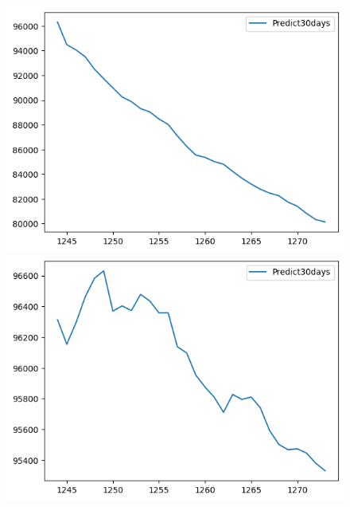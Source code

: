\begin{figure}[H]
\begin{minipage}{0.15\textwidth}
    \includegraphics[width=1\textwidth]{resources/chapter-5/predicted/VCB_ RNN_8-2_30days.png}
    \end{minipage}
    \hfill
        \begin{minipage}{0.15\textwidth}
    \centering
    \includegraphics[width=1\textwidth]{resources/chapter-5/predicted/VCB_ RNN_9-1_30days.png}
    \end{minipage}
    \hfill
    \begin{minipage}{0.15\textwidth}
    \centering

\end{minipage}
\end{figure}
